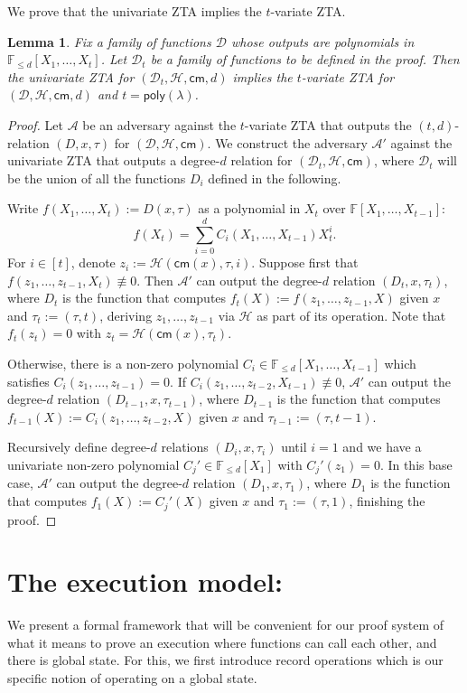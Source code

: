\documentclass[11pt]{article} %
\newcommand{\F}{\ensuremath{\mathbb F}\xspace}
\newcommand{\adv}{\ensuremath{\mathcal A}\xspace}
\newcommand{\advprime}{\ensuremath{\mathcal{A}'}\xspace}
\newcommand{\cm}{\ensuremath{\mathsf{cm}}\xspace}
\newcommand{\defeq}{:=}
\newcommand{\hash}{\ensuremath{\mathcal{H}}\xspace}
\newtheorem{lemma}{Lemma}[section]
\newcommand{\poly}{\ensuremath{\mathsf{poly(\lambda)}}\xspace}
\newcommand{\ztafuncs}{\ensuremath{\mathcal{D}}\xspace}
\begin{document}
We prove that the univariate ZTA implies the $t$-variate ZTA.

\begin{lemma}
Fix a family of functions \ztafuncs whose outputs are polynomials in $\F_{\leq d}[X_1,\ldots,X_t]$. Let $\ztafuncs_t$ be a family of functions to be defined in the proof. Then the univariate ZTA for $(\ztafuncs_t,\hash,\cm,d)$ implies the $t$-variate ZTA for $(\ztafuncs,\hash,\cm,d)$ and $t=\poly$.
\end{lemma}
\begin{proof}
Let \adv be an adversary against the $t$-variate ZTA that outputs the $(t,d)$-relation $(D,x,\tau)$ for $(\ztafuncs,\hash,\cm)$. We construct the adversary \advprime against the univariate ZTA that outputs a degree-$d$ relation for $(\ztafuncs_t,\hash,\cm)$, where $\ztafuncs_t$ will be the union of all the functions $D_i$ defined in the following.

Write $f(X_1,\ldots,X_t)\defeq D(x,\tau)$ as a polynomial in $X_t$ over $\F[X_1,\ldots,X_{t-1}]$:
\[f(X_t)=\sum_{i=0}^d C_i(X_1,\ldots,X_{t-1}) X_t^i.\]
For $i\in[t]$, denote $z_i\defeq\hash(\cm(x),\tau,i)$. Suppose first that $f(z_1,\ldots,z_{t-1},X_t)\not\equiv 0$. Then \advprime can output the degree-$d$ relation $(D_t,x,\tau_t)$, where $D_t$ is the function that computes $f_t(X)\defeq f(z_1,\ldots,z_{t-1},X)$ given $x$ and $\tau_t\defeq(\tau,t)$, deriving $z_1,\ldots,z_{t-1}$ via \hash as part of its operation. Note that $f_t(z_t)=0$ with $z_t=\hash(\cm(x),\tau_t)$.

Otherwise, there is a non-zero polynomial $C_i\in\F_{\leq d}[X_1,\ldots,X_{t-1}]$ which satisfies $C_i(z_1,\ldots,z_{t-1})=0$. If $C_i(z_1,\ldots,z_{t-2},X_{t-1})\not\equiv 0$, \advprime can output the degree-$d$ relation $(D_{t-1},x,\tau_{t-1})$, where $D_{t-1}$ is the function that computes $f_{t-1}(X)\defeq C_i(z_1,\ldots,z_{t-2},X)$ given $x$ and $\tau_{t-1}\defeq(\tau,t-1)$.

Recursively define degree-$d$ relations $(D_i,x,\tau_i)$ until $i=1$ and we have a univariate non-zero polynomial $C_j'\in\F_{\leq d}[X_1]$ with $C_j'(z_1)=0$. In this base case, \advprime can output the degree-$d$ relation $(D_1,x,\tau_1)$, where $D_1$ is the function that computes $f_1(X)\defeq C_j'(X)$ given $x$ and $\tau_1\defeq(\tau,1)$, finishing the proof.
\end{proof}

\section{The execution model:}
We present a formal framework that will be convenient for our proof system of what it means to prove an execution where functions can call each other, and there is global state.
For this, we first introduce record operations which is our specific notion of operating on a global state. 
\end{document}
